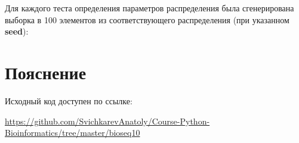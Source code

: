 \documentclass{article} %
\begin{document}
Для каждого теста определения параметров распределения была сгенерирована выборка в 100 элементов из соответствующего распределения (при указанном \textbf{seed}):


\section{Пояснение}
Исходный код доступен по ссылке:

\href{https://github.com/SvichkarevAnatoly/Course-Python-Bioinformatics/tree/master/bioseq10}{https://github.com/SvichkarevAnatoly/Course-Python-Bioinformatics/tree/master/bioseq10}
\end{document}
